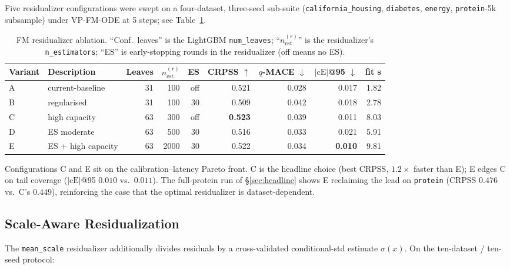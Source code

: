 \documentclass{uai2026}
\begin{document}
Five residualizer configurations were swept on a four-dataset, three-seed sub-suite (\texttt{california\_housing}, \texttt{diabetes}, \texttt{energy}, \texttt{protein}-5k subsample) under VP-FM-ODE at 5 steps; see Table~\ref{tab:resid-AE}.

\begin{table}[!h]
  \centering
  \caption{FM residualizer ablation. ``Conf.\ leaves'' is the LightGBM \texttt{num\_leaves}; ``$n_{\text{est}}^{(r)}$'' is the residualizer's \texttt{n\_estimators}; ``ES'' is early-stopping rounds in the residualizer (off means no ES).}\label{tab:resid-AE}
  \footnotesize
  \begin{tabular}{llrrrrrrr}
    \toprule
    Variant & Description & Leaves & $n_{\text{est}}^{(r)}$ & ES & CRPSS $\uparrow$ & $q$-MACE $\downarrow$ & $|\text{cE}|$@95 $\downarrow$ & fit s \\
    \midrule
    A & current-baseline   & 31 & 100 & off & 0.521 & 0.028 & 0.017 & 1.82 \\
    B & regularised        & 31 & 100 & 30  & 0.509 & 0.042 & 0.018 & 2.78 \\
    C & high capacity      & 63 & 300 & off & \textbf{0.523} & 0.039 & 0.011 & 8.03 \\
    D & ES moderate        & 63 & 500 & 30  & 0.516 & 0.033 & 0.021 & 5.91 \\
    E & ES + high capacity & 63 & 2000& 30  & 0.522 & 0.034 & \textbf{0.010} & 9.81 \\
    \bottomrule
  \end{tabular}
\end{table}

Configurations C and E sit on the calibration--latency Pareto front. C is the headline choice (best CRPSS, $1.2\times$ faster than E); E edges C on tail coverage ($|\text{cE}|$@95 $0.010$ vs.\ $0.011$). The full-protein run of \S\ref{sec:headline} shows E reclaiming the lead on \texttt{protein} (CRPSS $0.476$ vs.\ C's $0.449$), reinforcing the case that the optimal residualizer is dataset-dependent.

\subsection{Scale-Aware Residualization}\label{app:mean-scale}

The \texttt{mean\_scale} residualizer additionally divides residuals by a cross-validated conditional-std estimate $\hat\sigma(x)$. On the ten-dataset / ten-seed protocol:
\end{document}
